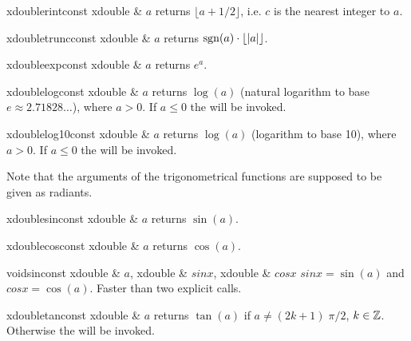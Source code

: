 \begin{fcode}{xdouble}{rint}{const xdouble & $a$}
  returns $\lfloor a + 1/2 \rfloor$, i.e. $c$ is the nearest integer to $a$.
\end{fcode}

\begin{fcode}{xdouble}{trunc}{const xdouble & $a$}
  returns $\operatorname{sgn}(a) \cdot \lfloor |a| \rfloor$.
\end{fcode}

\begin{fcode}{xdouble}{exp}{const xdouble & $a$}
  returns $e^a$.
\end{fcode}

\begin{fcode}{xdouble}{log}{const xdouble & $a$}
  returns $\log(a)$ (natural logarithm to base $e \approx 2.71828\dots$), where $a > 0$.  If $a
  \leq 0$ the \LEH will be invoked.
\end{fcode}

\begin{fcode}{xdouble}{log10}{const xdouble & $a$}
  returns $\log(a)$ (logarithm to base 10), where $a > 0$.  If $a \leq 0$ the \LEH will be
  invoked.
\end{fcode}




Note that the arguments of the trigonometrical functions are supposed to be given as radiants.

\begin{fcode}{xdouble}{sin}{const xdouble & $a$}
  returns $\sin(a)$.
\end{fcode}

\begin{fcode}{xdouble}{cos}{const xdouble & $a$}
  returns $\cos(a)$.
\end{fcode}

\begin{fcode}{void}{sin}{const xdouble & $a$, xdouble & $\mathit{sinx}$, xdouble & $\mathit{cosx}$}
  $\mathit{sinx} = \sin(a)$ and $\mathit{cosx} = \cos(a)$.  Faster than two explicit calls.
\end{fcode}

\begin{fcode}{xdouble}{tan}{const xdouble & $a$}
  returns $\tan(a)$ if $a \neq (2k+1)\;\pi/2$, $k \in \mathbb{Z}$.  Otherwise the \LEH will be
  invoked.
\end{fcode}

